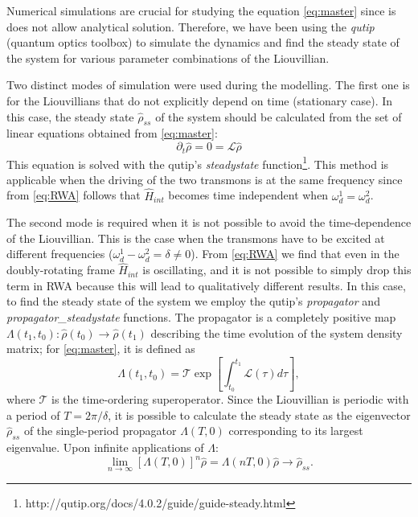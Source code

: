 \documentclass[%
 aip,
 amsmath,amssymb,
 reprint,%
]{revtex4-1}
\begin{document}
Numerical simulations are crucial for studying the equation \eqref{eq:master} since is does not allow  analytical solution. Therefore, we have been using the \textit{qutip}\cite{johansson2013qutip} (quantum optics toolbox) to simulate the dynamics and find the steady state of the system for various parameter combinations of the Liouvillian.

Two distinct modes of simulation were used during the modelling. The first one is for the Liouvillians that do not explicitly depend on time (stationary case). In this case, the steady state $\hat \rho_{ss}$ of the system should be calculated from the set of linear equations obtained from \eqref{eq:master}:
\begin{equation}
\partial_t \hat \rho = 0 = \mathcal{L} \hat \rho
\end{equation}
This equation is solved with the qutip's \textit{steadystate} function\footnote{http://qutip.org/docs/4.0.2/guide/guide-steady.html}. This method is applicable when the driving of the two transmons is at the same frequency since from \eqref{eq:RWA} follows that $\hat H_{int}$ becomes time independent when $\omega_d^1 = \omega_d^2$.

The second mode is required when it is not possible to avoid the time-dependence of the Liouvillian. This is the case when the transmons have to be excited at different frequencies ($\omega_d^1 - \omega_d^2 = \delta \neq 0$). From \eqref{eq:RWA} we find that even in the doubly-rotating frame $\hat H_{int}$ is oscillating, and it is not possible to simply drop this term in RWA because this will lead to qualitatively different results. In this case, to find the steady state of the system we employ the qutip's \textit{propagator} and \textit{propagator\_steadystate} functions. The propagator is a completely positive map $\Lambda(t_1, t_0): \hat \rho(t_0) \rightarrow \hat \rho(t_1)$ describing the time evolution of the system density matrix; for \eqref{eq:master}, it is defined as
\begin{equation}
\Lambda(t_1, t_0) = \mathcal{T} \exp [\int_{t_0}^{t_1} \mathcal L(\tau) d\tau],
\label{eq:propagator}
\end{equation}
where $\mathcal T$ is the time-ordering superoperator. Since the Liouvillian is periodic with a period of $T = 2\pi/\delta$, it is possible to calculate the steady state as the eigenvector $\hat \rho_{ss}$ of the single-period propagator $\Lambda(T, 0)$ corresponding to its largest eigenvalue\cite{dittrich1998quantum, rivas2012open}. Upon infinite applications of $\Lambda$: 
\[
\lim_{n\to \infty} \left[\Lambda(T, 0)\right]^n \hat \rho = \Lambda(nT, 0) \hat \rho \to \hat \rho_{ss}.
\]
\end{document}
